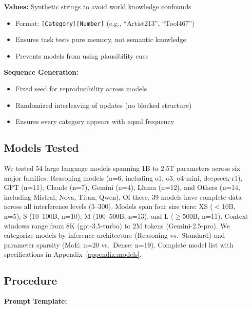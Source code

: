 \documentclass{article}
\begin{document}
\textbf{Values:} Synthetic strings to avoid world knowledge confounds
\begin{itemize}[itemsep=2pt,topsep=3pt,parsep=0pt]
    \item Format: \texttt{[Category][Number]} (e.g., ``Artist213'', ``Tool467'')
    \item Ensures task tests pure memory, not semantic knowledge
    \item Prevents models from using plausibility cues
\end{itemize}

\textbf{Sequence Generation:}
\begin{itemize}[itemsep=2pt,topsep=3pt,parsep=0pt]
    \item Fixed seed for reproducibility across models
    \item Randomized interleaving of updates (no blocked structure)
    \item Ensures every category appears with equal frequency
\end{itemize}

\subsection{Models Tested}

We tested 54 large language models spanning 1B to 2.5T parameters across six major families: Reasoning models (n=6, including o1, o3, o4-mini, deepseek-r1), GPT (n=11), Claude (n=7), Gemini (n=4), Llama (n=12), and Others (n=14, including Mistral, Nova, Titan, Qwen). Of these, 39 models have complete data across all interference levels (3--300). Models span four size tiers: XS ($<$10B, n=5), S (10--100B, n=10), M (100--500B, n=13), and L ($\geq$500B, n=11). Context windows range from 8K (gpt-3.5-turbo) to 2M tokens (Gemini-2.5-pro). We categorize models by inference architecture (Reasoning vs.\ Standard) and parameter sparsity (MoE: n=20 vs.\ Dense: n=19). Complete model list with specifications in Appendix~\ref{appendix:models}.

\subsection{Procedure}

\noindent\textbf{Prompt Template:}
\vspace{2pt}
\end{document}
